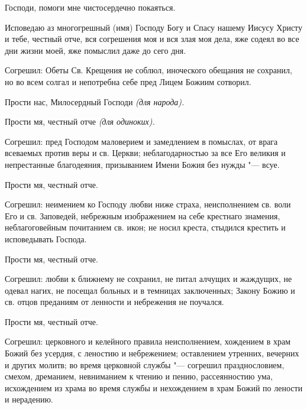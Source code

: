 \mychapterending

 


Господи, помоги мне чистосердечно покаяться. 


\mychapterending

 
Исповедаю аз многогрешный (имя) Господу Богу и Спасу нашему Иисусу Христу и тебе, честный отче, вся согрешения моя и вся злая моя дела, яже содеял во все дни жизни моей, яже помыслил даже до сего дня. 



Согрешил: Обеты Св. Крещения не соблюл, иноческого обещания не сохранил, но во всем солгал и непотребна себе пред Лицем Божиим сотворил. 



Прости нас, Милосердный Господи \itshape (для народа).

\normalfont{}Прости мя, честный отче \itshape (для одиноких).\normalfont{} 



Согрешил: пред Господом маловерием и замедлением в помыслах, от врага всеваемых против веры и св. Церкви; неблагодарностью за все Его великия и непрестанные благодеяния, призыванием Имени Божия без нужды "--- всуе. 



Прости мя, честный отче. 



Согрешил: неимением ко Господу любви ниже страха, неисполнением св. воли Его и св. Заповедей, небрежным изображением на себе крестнаго знамения, неблагоговейным почитанием св. икон; не носил креста, стыдился крестить и исповедывать Господа. 



Прости мя, честный отче. 



Согрешил: любви к ближнему не сохранил, не питал алчущих и жаждущих, не одевал нагих, не посещал больных и в темницах заключенных; Закону Божию и св. отцов преданиям от ленности и небрежения не поучался. 



Прости мя, честный отче. 



Согрешил: церковного и келейного правила неисполнением, хождением в храм Божий без усердия, с леностию и небрежением; оставлением утренних, вечерних и других молитв; во время церковной службы "--- согрешил празднословием, смехом, дреманием, невниманием к чтению и пению, рассеянностию ума, исхождением из храма во время службы и нехождением в храм Божий по лености и нерадению. 



